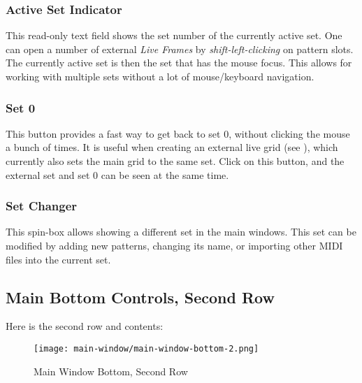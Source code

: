 \subsubsection{Active Set Indicator}
\label{subsubsec:introduction_active_set_indicator}

   This read-only text field shows the set number of the currently active set.
   One can open a number of external \textsl{Live Frames} by
   \textsl{shift-left-clicking} on pattern slots.
   The currently active set is then the
   set that has the mouse focus.  This allows for working with multiple sets
   without a lot of mouse/keyboard navigation.

\subsubsection{Set 0}
\label{subsubsec:introduction_set_zero}

   This button provides a fast way to get back to set 0, without clicking the
   mouse a bunch of times.
   It is useful when creating an external live grid
   (see ),
   which currently also sets the main grid to the same set.
   Click on this button, and the external set and set 0 can be seen at the same
   time.

\subsubsection{Set Changer}
\label{subsubsec:introduction_set_changer}

   This spin-box allows showing a different set in the main windows.
   This set can be modified by adding new patterns, changing its name, or
   importing other MIDI files into the current set.

\subsection{Main Bottom Controls, Second Row}
\label{subsec:introduction_main_bottom_controls_2}

   Here is the second row and contents:

\begin{figure}[H]
   \centering 
   \texttt{[image: main-window/main-window-bottom-2.png]}
   \caption{Main Window Bottom, Second Row}
   \label{fig:main_window_bottom_2}
\end{figure}

